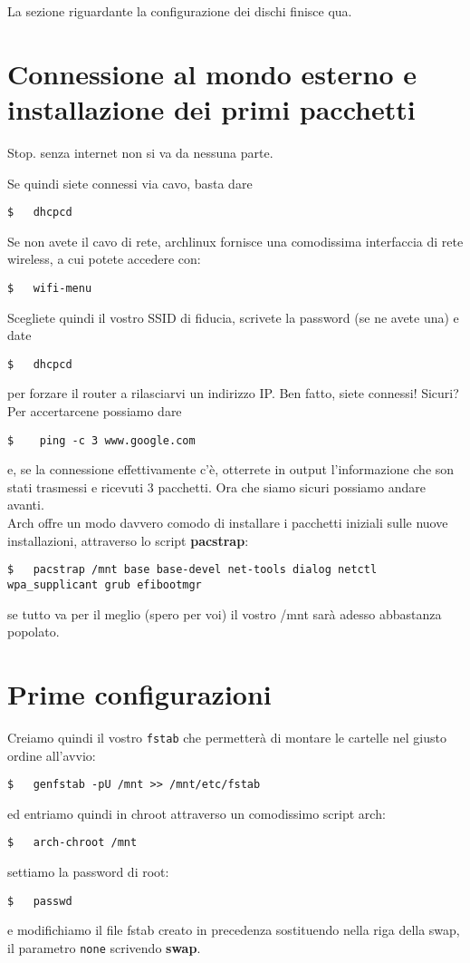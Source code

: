 \documentclass[twoside,italian]{book}
\begin{document}
    La sezione riguardante la configurazione dei dischi finisce qua.

\section{Connessione al mondo esterno e installazione dei primi pacchetti}

    Stop. senza internet non si va da nessuna parte.

    \medskip \noindent Se quindi siete connessi via cavo, basta dare 
    \begin{lstlisting}
$   dhcpcd
    \end{lstlisting}
    Se non avete il cavo di rete, archlinux fornisce una comodissima interfaccia di rete wireless, a cui potete accedere con:
    \begin{lstlisting}
$   wifi-menu
    \end{lstlisting}
    Scegliete quindi il vostro SSID di fiducia, scrivete la password (se ne avete una) e date \begin{lstlisting}
$   dhcpcd
    \end{lstlisting}
    per forzare il router a rilasciarvi un indirizzo IP. Ben fatto, siete connessi! Sicuri? Per accertarcene possiamo dare 
    \begin{lstlisting}
$    ping -c 3 www.google.com
    \end{lstlisting}
    e, se la connessione effettivamente c'è, otterrete in output l'informazione che son stati trasmessi e ricevuti 3 pacchetti. Ora che siamo sicuri possiamo andare avanti.\\

    Arch offre un modo davvero comodo di installare i pacchetti iniziali sulle nuove installazioni, attraverso lo script \textbf{pacstrap}:
    \begin{lstlisting}
$   pacstrap /mnt base base-devel net-tools dialog netctl wpa_supplicant grub efibootmgr
    \end{lstlisting}
    se tutto va per il meglio (spero per voi) il vostro /mnt sarà adesso abbastanza popolato.

\section{Prime configurazioni}
    Creiamo quindi il vostro \texttt{fstab} che permetterà di montare le cartelle nel giusto ordine all'avvio:
    \begin{lstlisting}
$   genfstab -pU /mnt >> /mnt/etc/fstab
    \end{lstlisting}
    ed entriamo quindi in chroot attraverso un comodissimo script arch:
    \begin{lstlisting}
$   arch-chroot /mnt
    \end{lstlisting}
    settiamo la password di root: 
    \begin{lstlisting}
$   passwd
    \end{lstlisting}
    e modifichiamo il file fstab creato in precedenza sostituendo nella riga della swap, il parametro \texttt{none} scrivendo \textbf{swap}.
\end{document}
